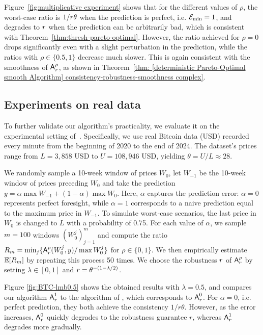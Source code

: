 Figure~\ref{fig:multiplicative experiment} shows that for the different values of $\rho$, the worst-case ratio is $1/r \theta$ when the prediction is perfect, i.e. $\mathcal{E}_{\min} = 1$, 
 and degrades to $r$ when the prediction can be arbitrarily bad, which is consistent with Theorem~\ref{thm:thresh-pareto-optimal}. However, the ratio achieved for $\rho=0$ drops significantly even with a slight perturbation in the prediction, while the ratios with $\rho \in \{0.5, 1\}$ decrease much slower. This is again consistent with the smoothness of $\mbox{\textup{\textsf{A}}}^\rho_{r}$, as shown in Theorem~\ref{thm: [deterministic Pareto-Optimal smooth Algorithm] consistency-robustness-smoothness complex}.









\subsection{Experiments on real data}
To further validate our algorithm’s practicality, we evaluate it on the experimental setting of~\citep{sun_pareto-optimal_2021}. Specifically, we use real Bitcoin data (USD) recorded every minute from the beginning of 2020 to the end of 2024. The dataset’s prices range from $L = 3,858$ USD to $U = 108,946$ USD, yielding $\theta = U/L \approx 28$. 

We randomly sample a 10-week window of prices $W_0$, let $W_{-1}$ be the 10-week window of prices preceding $W_0$ and take the prediction  
$y = \alpha \max W_{-1} + (1-\alpha) \max W_0$. Here, $\alpha$ captures the prediction error: $\alpha = 0$ represents perfect foresight, while $\alpha = 1$ corresponds to a naive prediction equal to the maximum price in $W_{-1}$. To simulate worst-case scenarios, the last price in $W_0$ is changed to $L$ with a probability of 0.75.
For each value of $\alpha$, we sample $m = 100$ windows $(W^j_0)_{j=1}^m$ and compute the 
ratio $R_m = \min_j \{\mbox{\textup{\textsf{A}}}^\rho_r(W^j_0, y)/\max W^j_0\}$ for $\rho \in \{0,1\}$. We then empirically estimate $\mathbb{E}[R_m]$ by repeating this process 50 times. We choose the robustness $r$ of $\mbox{\textup{\textsf{A}}}^\rho_r$ by setting $\lambda \in [0,1]$ and $r = \theta^{-(1-\lambda/2)}$. 

Figure \ref{fig:BTC-lmb0.5} shows the obtained results with $\lambda = 0.5$, and compares our algorithm $\mbox{\textup{\textsf{A}}}^1_r$ to the algorithm of \cite{sun_pareto-optimal_2021}, which corresponds to $\mbox{\textup{\textsf{A}}}^0_r$. For $\alpha = 0$, i.e. perfect prediction, they both achieve the consistency $1/r\theta$. However, as the error increases, $\mbox{\textup{\textsf{A}}}^0_r$ quickly degrades to the robustness guarantee $r$, whereas $\mbox{\textup{\textsf{A}}}^1_r$ degrades more gradually. 








